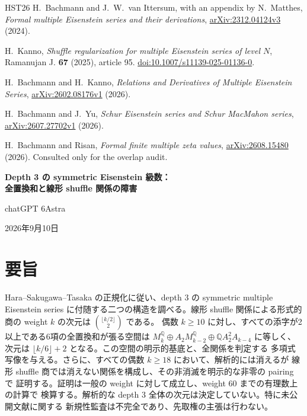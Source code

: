 \documentclass[12pt]{amsart}
\theoremstyle{definition}
\theoremstyle{remark}
\numberwithin{equation}{section}
\newcommand{\Q}{\mathbb{Q}}
\numberwithin{equation}{section}
\begin{document}
\begin{thebibliography}{HST26}
H.~Bachmann and J.~W.~van Ittersum, with an appendix by N.~Matthes,
\emph{Formal multiple Eisenstein series and their derivations},
\href{https://arxiv.org/abs/2312.04124}{arXiv:2312.04124v3} (2024).

H.~Kanno, \emph{Shuffle regularization for multiple Eisenstein series of level $N$},
Ramanujan J. \textbf{67} (2025), article 95.
\href{https://doi.org/10.1007/s11139-025-01136-0}{doi:10.1007/s11139-025-01136-0}.

H.~Bachmann and H.~Kanno,
\emph{Relations and Derivatives of Multiple Eisenstein Series},
\href{https://arxiv.org/abs/2602.08176}{arXiv:2602.08176v1} (2026).

H.~Bachmann and J.~Yu,
\emph{Schur Eisenstein series and Schur MacMahon series},
\href{https://arxiv.org/abs/2607.27702}{arXiv:2607.27702v1} (2026).

H.~Bachmann and Risan,
\emph{Formal finite multiple zeta values},
\href{https://arxiv.org/abs/2608.15480}{arXiv:2608.15480} (2026).
Consulted only for the overlap audit.
\end{thebibliography}

\clearpage
\setcounter{section}{0}
\renewcommand{\sectionname}{}
\renewcommand{\proofname}{証明}
\renewcommand{\thesection}{J.\arabic{section}}
\renewcommand{\theHsection}{J.\arabic{section}}
\begin{center}
{\Large\bfseries Depth 3 の symmetric Eisenstein 級数：\\
全置換和と線形 shuffle 関係の障害}\par\medskip
chatGPT 6Astra\par\medskip
2026年9月10日
\end{center}
\section*{要旨}
Hara--Sakugawa--Tasaka の正規化に従い、depth 3 の symmetric multiple
Eisenstein series に付随する二つの構造を調べる。線形 shuffle 関係による形式的商の
weight $k$ の次元は $\binom{\lfloor k/2\rfloor}{2}$ である。
偶数 $k\ge10$ に対し、すべての添字が2以上である6項の全置換和が張る空間は
$M_k^{\Q}\oplus A_2M_{k-2}^{\Q}\oplus\Q A_2^2A_{k-4}$ に等しく、
次元は $\lfloor k/6\rfloor+2$ となる。この空間の明示的基底と、全関係を判定する
多項式写像を与える。さらに、すべての偶数 $k\ge18$ において、解析的には消えるが
線形 shuffle 商では消えない関係を構成し、その非消滅を明示的な非零の pairing で
証明する。証明は一般の weight に対して成立し、weight 60 までの有理数上の計算で
検算する。解析的な depth 3 全体の次元は決定していない。特に未公開文献に関する
新規性監査は不完全であり、先取権の主張は行わない。
\end{document}
